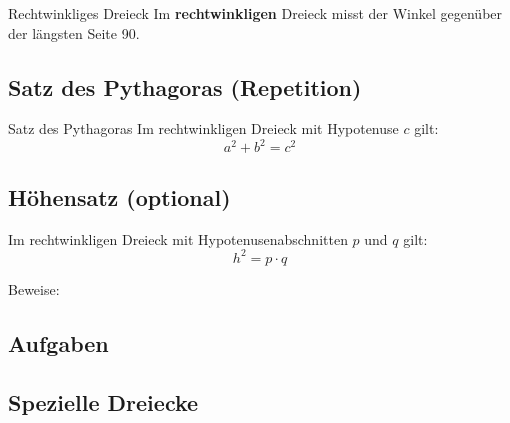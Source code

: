 \begin{definition}{Rechtwinkliges Dreieck}{}
Im \textbf{rechtwinkligen} Dreieck misst der Winkel gegenüber der
längsten Seite 90\degre.
\end{definition}



\subsection{Satz des Pythagoras (Repetition)}
\label{satzDesPythagoras}
\begin{gesetz}{Satz des Pythagoras}{}
Im rechtwinkligen Dreieck mit Hypotenuse $c$ gilt:
$$a^2 + b^2 = c^2$$
\end{gesetz}




\subsection{Höhensatz (optional)}

Im rechtwinkligen Dreieck mit Hypotenusenabschnitten $p$ und $q$ gilt:
$$h^2=p\cdot{}q$$

Beweise:


\subsection*{Aufgaben}

\newpage

\subsection{Spezielle Dreiecke}\label{spezielleDreiecke}


